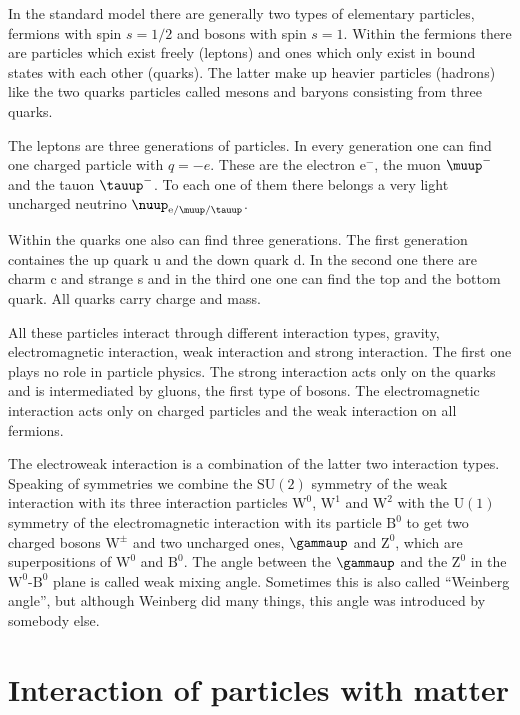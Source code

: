 \documentclass[11pt, english, fleqn, DIV=15, headinclude, BCOR=2cm]{scrreprt}
\begin{document}
In the standard model there are generally two types of elementary particles,
fermions with spin $s = 1/2$ and bosons with spin $s = 1$. Within the fermions
there are particles which exist freely (leptons) and ones which only exist in
bound states with each other (quarks). The latter make up heavier particles
(hadrons) like the two quarks particles called mesons and baryons consisting
from three quarks. 

The leptons are three generations of particles. In every
generation one can find one charged particle with $q = -e$. These are the
electron $\mathrm e^-$, the muon $\muup^-$ and the tauon $\tauup^-$. To each
one of them there belongs a very light uncharged neutrino
$\nuup_{\mathrm{e}/\muup/\tauup}$.

Within the quarks one also can find three generations. The first generation
containes the up quark u and the down quark d. In the second one there are
charm c and strange s and in the third one one can find the top and the bottom
quark. All quarks carry charge and mass.

All these particles interact through different interaction types, gravity,
electromagnetic interaction, weak interaction and strong interaction. The first
one plays no role in particle physics. The strong interaction acts only on the
quarks and is intermediated by gluons, the first type of bosons. The
electromagnetic interaction acts only on charged particles and the weak
interaction on all fermions. 

The electroweak interaction is a combination of the latter two interaction
types. Speaking of symmetries we combine the $\mathrm{SU}(2)$ symmetry of the
weak interaction with its three interaction particles $\mathrm W^0$, $\mathrm
W^1$ and $\mathrm W^2$ with the $\mathrm U(1)$ symmetry of the electromagnetic
interaction with its particle $\mathrm B^0$ to get two charged bosons $\mathrm
W^\pm$ and two uncharged ones, $\gammaup$ and $\mathrm Z^0$, which are
superpositions of $\mathrm W^0$ and $\mathrm B^0$. The angle between the
$\gammaup$ and the $\mathrm Z^0$ in the $\mathrm W^0$-$\mathrm B^0$ plane is
called weak mixing angle. Sometimes this is also called \enquote{Weinberg
angle}, but although Weinberg did many things, this angle was introduced by
somebody else.

\section{Interaction of particles with matter}
\end{document}

